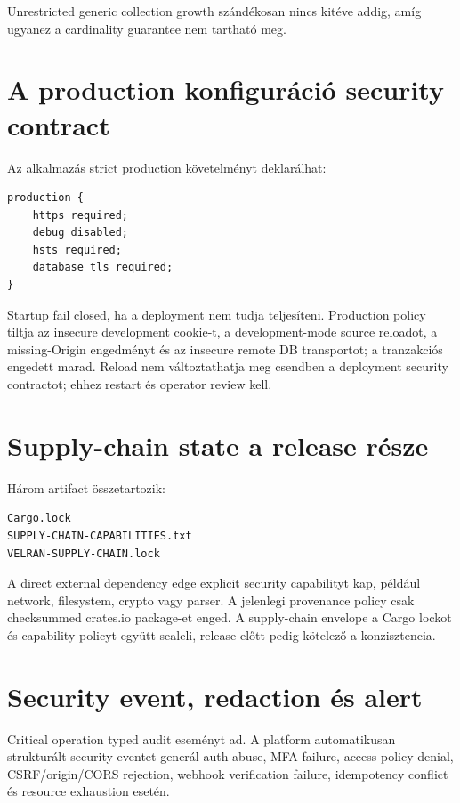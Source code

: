 Unrestricted generic collection growth szándékosan nincs kitéve addig, amíg ugyanez a cardinality guarantee nem tartható meg.

\section{A production konfiguráció security contract}

Az alkalmazás strict production követelményt deklarálhat:

\begin{lstlisting}[language=Velran]
production {
    https required;
    debug disabled;
    hsts required;
    database tls required;
}
\end{lstlisting}

Startup fail closed, ha a deployment nem tudja teljesíteni. Production policy tiltja az insecure development cookie-t, a development-mode source reloadot, a missing-Origin engedményt és az insecure remote DB transportot; a tranzakciós  engedett marad. Reload nem változtathatja meg csendben a deployment security contractot; ehhez restart és operator review kell.

\section{Supply-chain state a release része}

Három artifact összetartozik:

\begin{lstlisting}
Cargo.lock
SUPPLY-CHAIN-CAPABILITIES.txt
VELRAN-SUPPLY-CHAIN.lock
\end{lstlisting}

A direct external dependency edge explicit security capabilityt kap, például network, filesystem, crypto vagy parser. A jelenlegi provenance policy csak checksummed crates.io package-et enged. A supply-chain envelope a Cargo lockot és capability policyt együtt sealeli, release előtt pedig kötelező a  konzisztencia.

\section{Security event, redaction és alert}

Critical operation typed audit eseményt ad. A platform automatikusan strukturált security eventet generál auth abuse, MFA failure, access-policy denial, CSRF/origin/CORS rejection, webhook verification failure, idempotency conflict és resource exhaustion esetén.

